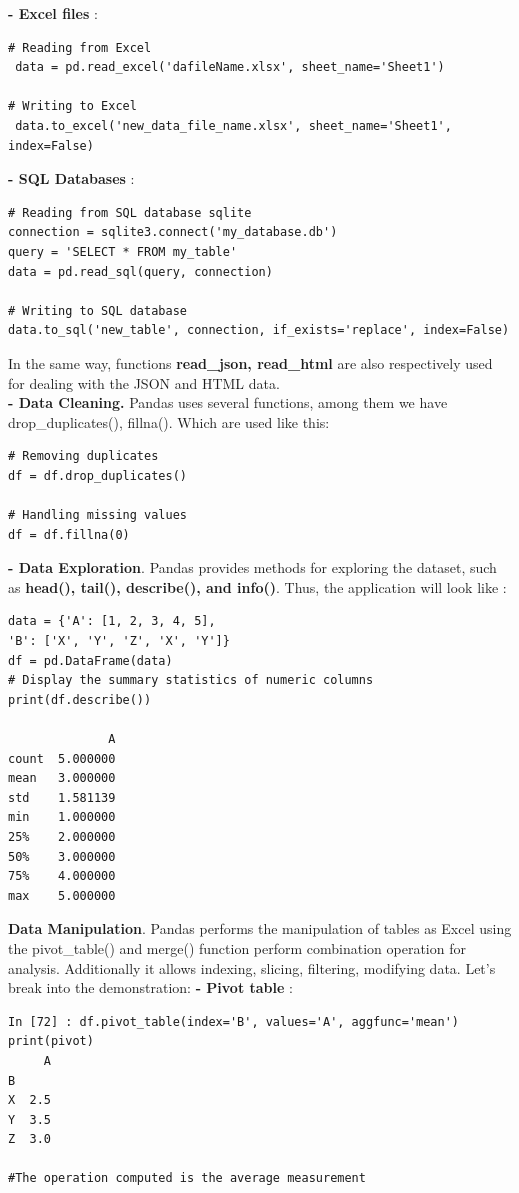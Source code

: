 \documentclass[12pt,a4paper]{report}
\begin{document}
\noindent \textbf{- Excel files} : 
 \begin{lstlisting}[style=stylepython]
# Reading from Excel
 data = pd.read_excel('dafileName.xlsx', sheet_name='Sheet1')

# Writing to Excel
 data.to_excel('new_data_file_name.xlsx', sheet_name='Sheet1', index=False)
 \end{lstlisting} 
 
 \textbf{- SQL Databases} :
  \begin{lstlisting}[style=stylepython]
# Reading from SQL database sqlite
connection = sqlite3.connect('my_database.db')
query = 'SELECT * FROM my_table'
data = pd.read_sql(query, connection)

# Writing to SQL database
data.to_sql('new_table', connection, if_exists='replace', index=False)
 \end{lstlisting}
 
In the same way, functions \textbf{read\_json, read\_html}  are also respectively used for dealing with the JSON and HTML data.\\

\textbf{- Data Cleaning.} Pandas uses several functions, among them we have drop\_duplicates(), fillna(). Which are used like this:
\begin{lstlisting}[style=stylepython]
# Removing duplicates
df = df.drop_duplicates()

# Handling missing values
df = df.fillna(0)
\end{lstlisting} 

\textbf{- Data Exploration}. Pandas provides methods for exploring the dataset, such as \textbf{head(), tail(), describe(), and info()}. Thus, the application will look like :
\begin{lstlisting}[style=stylepython]
data = {'A': [1, 2, 3, 4, 5],
'B': ['X', 'Y', 'Z', 'X', 'Y']}
df = pd.DataFrame(data)
# Display the summary statistics of numeric columns
print(df.describe()) 

              A
count  5.000000
mean   3.000000
std    1.581139
min    1.000000
25%    2.000000
50%    3.000000
75%    4.000000
max    5.000000
\end{lstlisting} 

\noindent \textbf{Data Manipulation}. Pandas performs the manipulation of tables as Excel using the pivot\_table() and merge() function perform combination operation for analysis.
Additionally it allows indexing, slicing, filtering, modifying data. Let's break into the demonstration:
\newline
\textbf{- Pivot table }:
\begin{lstlisting}[style=stylepython]
In [72] : df.pivot_table(index='B', values='A', aggfunc='mean')
print(pivot) 
     A
B     
X  2.5
Y  3.5
Z  3.0 

#The operation computed is the average measurement
\end{lstlisting} 
\end{document}

